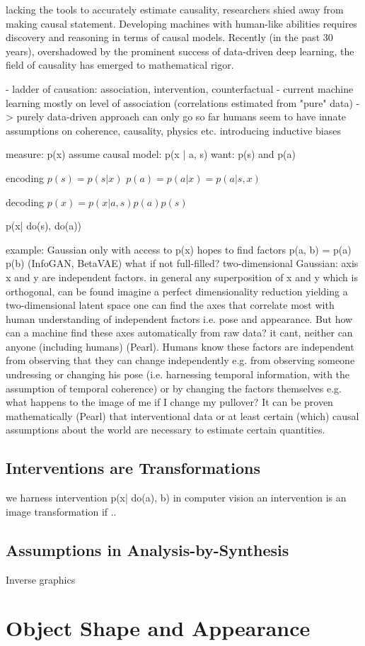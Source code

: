 	lacking the tools to accurately estimate causality, researchers shied away from making causal statement. Developing machines with human-like abilities requires discovery and reasoning in terms of causal models. Recently (in the past 30 years), overshadowed by the prominent success of data-driven deep learning, the field of causality has emerged to mathematical rigor.

	- ladder of causation: association, intervention, counterfactual
	- current machine learning mostly on level of association (correlations estimated from "pure" data)
	-> purely data-driven approach can only go so far
	humans seem to have innate assumptions on coherence, causality, physics etc. introducing inductive biases


	measure: p(x)
	assume causal model: p(x | a, s)
	want: p(s) and p(a)

	encoding
	$p(s) = p(s | x )$
	$p(a) = p(a | x) = p(a | s, x)$

	decoding
	$p(x) = p(x | a, s) p(a) p(s)$

	p(x| do(s), do(a))

	example: Gaussian
	only with access to p(x)
	hopes to find factors p(a, b) = p(a) p(b) (InfoGAN, BetaVAE)
	what if not full-filled?
	two-dimensional Gaussian: axis x and y are independent factors.
	in general any superposition of x and y which is orthogonal, can be found
	imagine a perfect dimensionality reduction yielding a  two-dimensional latent space one can find the axes that correlate most with human understanding of independent factors i.e. pose and appearance.
	But how can a machine find these axes automatically from raw data? it cant, neither can anyone (including humans) (Pearl). Humans know these factors are independent from observing that they can change independently e.g. from observing someone undressing or changing his pose (i.e. harnessing temporal information, with the assumption of temporal coherence) or by changing the factors themselves e.g. what happens to the image of me if I change my pullover?
	It can be proven mathematically (Pearl) that interventional data or at least certain (which) causal assumptions about the world are necessary to estimate certain quantities.

	\subsection{Interventions are Transformations}
	we harness intervention
	p(x| do(a), b)
	in computer vision an intervention is an image transformation if ..


	\subsection{Assumptions in Analysis-by-Synthesis}
		Inverse graphics


\section{Object Shape and Appearance}

